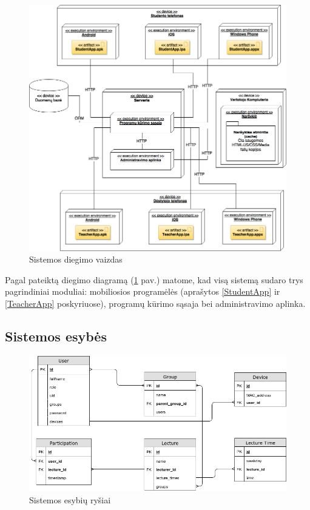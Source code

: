 \documentclass{VUMIFPSkursinis}
\begin{document}
\begin{figure}[H]
	\centering
	\includegraphics[scale=0.5]{img/kursinio_deployment.png}
	\caption{Sistemos diegimo vaizdas}
	\label{img:deployment}
\end{figure}

Pagal pateiktą diegimo diagramą (\ref{img:deployment} pav.) matome, kad visą sistemą sudaro trys pagrindiniai moduliai: mobiliosios programėlės (aprašytos \ref{StudentApp} ir \ref{TeacherApp} poskyriuose), programų kūrimo sąsaja bei administravimo aplinka.

\subsection{Sistemos esybės}

\begin{figure}[H]
	\centering
	\includegraphics[scale=0.5]{img/Bakalauro-ER.png}
	\caption{Sistemos esybių ryšiai}
	\label{img:er-diagram}
\end{figure}
\end{document}
